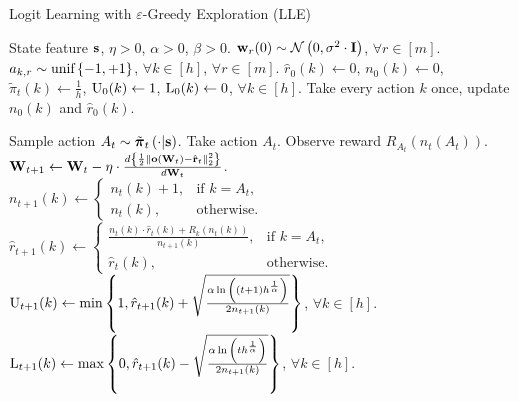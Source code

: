 \documentclass{article}
\begin{document}
\begin{algorithm}[h]
	\caption{Logit Learning with $\varepsilon$-Greedy Exploration (LLE)}
	\label{alg:logit_learning_eps_greedy_exploration}
	\begin{algorithmic}
		 State feature ${\mathbf{s}}$, $\eta > 0$, $\alpha > 0$, $\beta > 0$.
		\STATE ${\mathbf{w}}_r(0) \sim {\mathcal{N}}\left( 0, \sigma^2 \cdot {\mathbf{I}} \right)$, $\forall r \in [m]$. $a_{k, r} \sim {\text{unif}}\left\{-1, +1\right\}$, $\forall k \in [h]$, $\forall r \in [m]$.
		\STATE $\hat{r}_{0}(k) \gets 0$, $n_{0}(k) \gets 0$, $\tilde{\pi}_t(k) \gets \frac{1}{h}$, ${\text{U}}_{0}(k) \gets 1$, ${\text{L}}_{0}(k) \gets 0$, $\forall k \in [h]$.
		\STATE Take every action $k$ once, update $n_{0}(k)$ and $\hat{r}_{0}(k)$.
		
		\STATE Sample action $A_{t} \sim \tilde{{\boldsymbol{\pi}}}_t\left(\cdot \middle| {\mathbf{s}} \right)$. Take action $A_{t}$. Observe reward $R_{ A_{t}}\left(n_{t}\left(A_t\right) \right)$.
		\STATE ${\mathbf{W}}_{t+1} \leftarrow {\mathbf{W}}_t - \eta \cdot \frac{d \left\{ \frac{1}{2} \left\| {\mathbf{o}}\left( {\mathbf{W}}_t\right) - \hat{{\mathbf{r}}}_t \right\|_2^2 \right\}}{d {\mathbf{W}}_t}$.
		\STATE $n_{t+1}(k) \gets \left. 
		    \begin{cases}
		    n_{t}(k) + 1, & \text{if } k = A_t, \\
		    n_{t}(k), & \text{otherwise}.
		    \end{cases}
		    \right. \qquad$
		$\hat{r}_{t+1}(k) \gets \left. 
		    \begin{cases}
		    \frac{n_{t}(k) \cdot \hat{r}_{t}(k) + R_{k}\left(n_{t}(k)\right) }{n_{t+1}(k)}, & \text{if } k = A_t, \\
		    \hat{r}_{t}(k), & \text{otherwise}.
		    \end{cases}
		    \right.$
		\STATE ${\text{U}}_{t+1}(k) \gets
		    \min{\left\{ 1, \hat{r}_{t+1}(k) + \sqrt{\frac{\alpha \ln{\left( (t+1) h^{\frac{1}{\alpha}}\right)}}{2 n_{t+1}(k)}}\right\}}$, $\forall k \in [h]$.
		\STATE ${\text{L}}_{t+1}(k) \gets 
		    \max{\left\{ 0, \hat{r}_{t+1}(k) - \sqrt{\frac{\alpha \ln{\left( t h^{\frac{1}{\alpha}}\right)}}{2 n_{t+1}(k)}}\right\}}$, $\forall k \in [h]$.
		

\end{algorithmic}
\end{algorithm}
\end{document}

